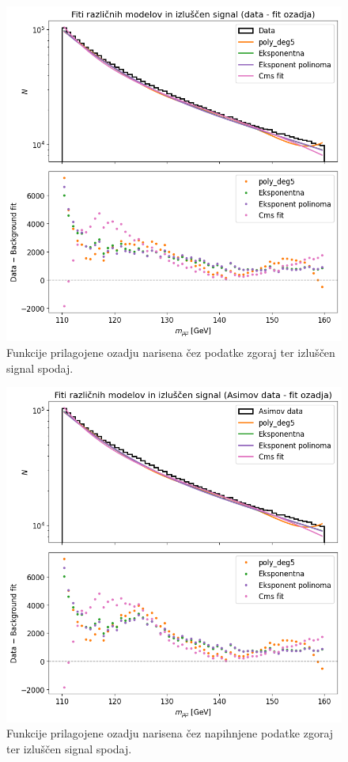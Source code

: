 \documentclass[slovene,11pt,a4paper]{article}
\begin{document}
\begin{figure}[h!]
    \centering
    \includegraphics[width=0.8\linewidth]{imgs/IzluscenSignalData.png}
    \caption{Funkcije prilagojene ozadju narisena čez podatke zgoraj ter izluščen signal spodaj.}
    \label{fig:IzluscenSignalData}
\end{figure}

\newpage

\begin{figure}[h!]
    \centering
    \includegraphics[width=0.8\linewidth]{imgs/IzluscenSignalAsimovData.png}
    \caption{Funkcije prilagojene ozadju narisena čez napihnjene podatke zgoraj ter izluščen signal spodaj.}
    \label{fig:IzluscenSignalAsimovData}
\end{figure}
\end{document}
